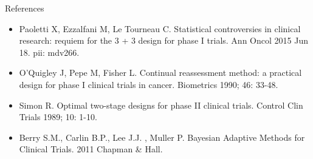 \documentclass{beamer}
\begin{document}
\begin{frame}{References}

\begin{itemize}
\item
  Paoletti X, Ezzalfani M, Le Tourneau C. Statistical controversies in
  clinical research: requiem for the 3 + 3 design for phase I trials.
  Ann Oncol 2015 Jun 18. pii: mdv266.
\item
  O'Quigley J, Pepe M, Fisher L. Continual reassessment method: a
  practical design for phase I clinical trials in cancer. Biometrics
  1990; 46: 33-48.
\item
  Simon R. Optimal two-stage designs for phase II clinical trials.
  Control Clin Trials 1989; 10: 1-10.
\item
  Berry S.M., Carlin B.P., Lee J.J. , Muller P. Bayesian Adaptive
  Methods for Clinical Trials. 2011 Chapman \& Hall.
\end{itemize}

\end{frame}
\end{document}

